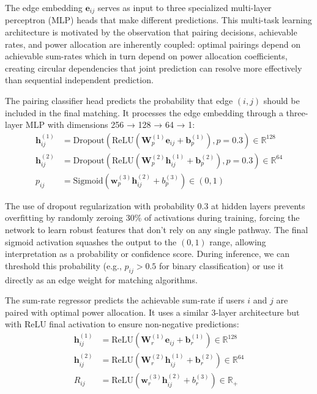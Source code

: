 The edge embedding $\mathbf{e}_{ij}$ serves as input to three specialized multi-layer perceptron (MLP) heads that make different predictions. This multi-task learning architecture is motivated by the observation that pairing decisions, achievable rates, and power allocation are inherently coupled: optimal pairings depend on achievable sum-rates which in turn depend on power allocation coefficients, creating circular dependencies that joint prediction can resolve more effectively than sequential independent prediction.

The pairing classifier head predicts the probability that edge $(i,j)$ should be included in the final matching. It processes the edge embedding through a three-layer MLP with dimensions 256 → 128 → 64 → 1:
\begin{equation}
\begin{aligned}
\mathbf{h}_{ij}^{(1)} &= \text{Dropout}(\text{ReLU}(\mathbf{W}_p^{(1)} \mathbf{e}_{ij} + \mathbf{b}_p^{(1)}), p=0.3) \in \mathbb{R}^{128} \\
\mathbf{h}_{ij}^{(2)} &= \text{Dropout}(\text{ReLU}(\mathbf{W}_p^{(2)} \mathbf{h}_{ij}^{(1)} + \mathbf{b}_p^{(2)}), p=0.3) \in \mathbb{R}^{64} \\
p_{ij} &= \text{Sigmoid}(\mathbf{w}_p^{(3)} \mathbf{h}_{ij}^{(2)} + b_p^{(3)}) \in (0,1)
\end{aligned}
\end{equation}

The use of dropout regularization with probability 0.3 at hidden layers prevents overfitting by randomly zeroing 30\% of activations during training, forcing the network to learn robust features that don't rely on any single pathway. The final sigmoid activation squashes the output to the $(0,1)$ range, allowing interpretation as a probability or confidence score. During inference, we can threshold this probability (e.g., $p_{ij} > 0.5$ for binary classification) or use it directly as an edge weight for matching algorithms.

The sum-rate regressor predicts the achievable sum-rate if users $i$ and $j$ are paired with optimal power allocation. It uses a similar 3-layer architecture but with ReLU final activation to ensure non-negative predictions:
\begin{equation}
\begin{aligned}
\mathbf{h}_{ij}^{(1)} &= \text{ReLU}(\mathbf{W}_r^{(1)} \mathbf{e}_{ij} + \mathbf{b}_r^{(1)}) \in \mathbb{R}^{128} \\
\mathbf{h}_{ij}^{(2)} &= \text{ReLU}(\mathbf{W}_r^{(2)} \mathbf{h}_{ij}^{(1)} + \mathbf{b}_r^{(2)}) \in \mathbb{R}^{64} \\
\hat{R}_{ij} &= \text{ReLU}(\mathbf{w}_r^{(3)} \mathbf{h}_{ij}^{(2)} + b_r^{(3)}) \in \mathbb{R}_+
\end{aligned}
\end{equation}

